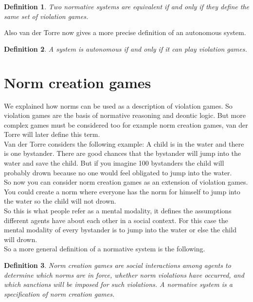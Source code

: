 \documentclass[conference]{hehe}
\newtheorem{definition}{Definition}
\begin{document}
\begin{definition}
Two normative systems are equivalent if and only if they define the same set of violation games.\cite{b2}\\
\end{definition}

Also van der Torre now gives a more precise definition of an autonomous system.

\begin{definition}
A system is autonomous if and only if it can play violation games.\cite{b2}\\
\end{definition}


\section{Norm creation games}
We explained how norms can be used as a description of violation games. So violation games are the basis of normative reasoning and deontic logic. But more complex games must be considered too for example norm creation games, van der Torre will later define this term.\\
Van der Torre considers the following example: A child is in the water and there is one bystander. There are good chances that the bystander will jump into the water and save the child. But if you imagine 100 bystanders the child will probably drown because no one would feel obligated to jump into the water.\\
So now you can consider norm creation games as an extension of violation games. You could create a norm where everyone has the norm for himself to jump into the water so the child will not drown.\\
So this is what people refer as a mental modality, it defines the assumptions different agents have about each other in a social context. For this case the mental modality of every bystander is to jump into the water or else the child will drown.\\
So a more general definition of a normative system is the following.\\

\begin{definition}
Norm creation games are social
interactions among agents to determine which norms are in force, whether norm violations have occurred, and which sanctions will be imposed for such violations. A
normative system is a specification of norm creation games.\cite{b2}\\
\end{definition}
\end{document}
